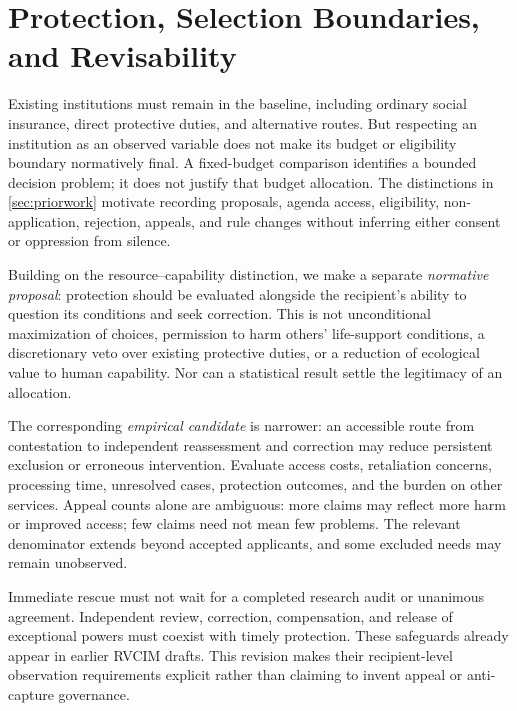 \documentclass[11pt,a4paper]{article}
\numberwithin{equation}{section}
\theoremstyle{definition}
\theoremstyle{plain}
\theoremstyle{remark}
\begin{document}
\section{Protection, Selection Boundaries, and Revisability}
\label{sec:revisability}

Existing institutions must remain in the baseline, including ordinary social insurance, direct protective duties, and alternative routes. But respecting an institution as an observed variable does not make its budget or eligibility boundary normatively final. A fixed-budget comparison identifies a bounded decision problem; it does not justify that budget allocation. The distinctions in \cref{sec:priorwork} motivate recording proposals, agenda access, eligibility, non-application, rejection, appeals, and rule changes without inferring either consent or oppression from silence.

Building on the resource--capability distinction, we make a separate \emph{normative proposal}: protection should be evaluated alongside the recipient's ability to question its conditions and seek correction. This is not unconditional maximization of choices, permission to harm others' life-support conditions, a discretionary veto over existing protective duties, or a reduction of ecological value to human capability. Nor can a statistical result settle the legitimacy of an allocation.

The corresponding \emph{empirical candidate} is narrower: an accessible route from contestation to independent reassessment and correction may reduce persistent exclusion or erroneous intervention. Evaluate access costs, retaliation concerns, processing time, unresolved cases, protection outcomes, and the burden on other services. Appeal counts alone are ambiguous: more claims may reflect more harm or improved access; few claims need not mean few problems. The relevant denominator extends beyond accepted applicants, and some excluded needs may remain unobserved.

Immediate rescue must not wait for a completed research audit or unanimous agreement. Independent review, correction, compensation, and release of exceptional powers must coexist with timely protection. These safeguards already appear in earlier RVCIM drafts. This revision makes their recipient-level observation requirements explicit rather than claiming to invent appeal or anti-capture governance.

\end{document}

